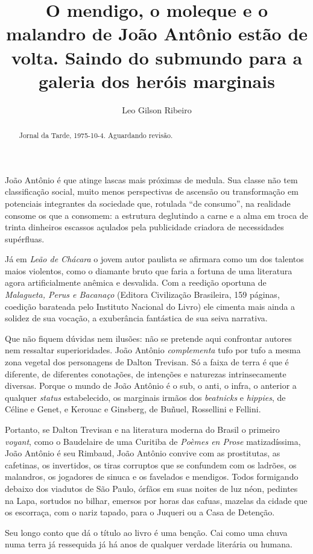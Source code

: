 \documentclass[
  letterpaper,
  DIV=11,
  numbers=noendperiod]{scrartcl}
\title{O mendigo, o moleque e o malandro de João Antônio estão de volta.
Saindo do submundo para a galeria dos heróis marginais}
\author{Leo Gilson Ribeiro}
\date{}
\begin{document}
\maketitle
\begin{abstract}
Jornal da Tarde, 1975-10-4. Aguardando revisão.
\end{abstract}

João Antônio é que atinge lascas mais próximas de medula. Sua classe não
tem classificação social, muito menos perspectivas de ascensão ou
transformação em potenciais integrantes da sociedade que, rotulada ``de
consumo'', na realidade consome os que a consomem: a estrutura
deglutindo a carne e a alma em troca de trinta dinheiros escassos
açulados pela publicidade criadora de necessidades supérfluas.

Já em \emph{Leão de Chácara} o jovem autor paulista se afirmara como um
dos talentos maios violentos, como o diamante bruto que faria a fortuna
de uma literatura agora artificialmente anêmica e desvalida. Com a
reedição oportuna de \emph{Malagueta, Perus e Bacanaço} (Editora
Civilização Brasileira, 159 páginas, coedição barateada pelo Instituto
Nacional do Livro) ele cimenta mais ainda a solidez de sua vocação, a
exuberância fantástica de sua seiva narrativa.

Que não fiquem dúvidas nem ilusões: não se pretende aqui confrontar
autores nem ressaltar superioridades. João Antônio \emph{complementa}
tufo por tufo a mesma zona vegetal dos personagens de Dalton Trevisan.
Só a faixa de terra é que é diferente, de diferentes conotações, de
intenções e naturezas intrinsecamente diversas. Porque o mundo de João
Antônio é o sub, o anti, o infra, o anterior a qualquer \emph{status}
estabelecido, os marginais irmãos dos \emph{beatnicks} e \emph{hippies},
de Céline e Genet, e Kerouac e Ginsberg, de Buñuel, Rossellini e
Fellini.

Portanto, se Dalton Trevisan e na literatura moderna do Brasil o
primeiro \emph{voyant}, como o Baudelaire de uma Curitiba de
\emph{Poèmes en Prose} matizadíssima, João Antônio é seu Rimbaud, João
Antônio convive com as prostitutas, as cafetinas, os invertidos, os
tiras corruptos que se confundem com os ladrões, os malandros, os
jogadores de sinuca e os favelados e mendigos. Todos formigando debaixo
dos viadutos de São Paulo, órfãos em suas noites de luz néon, pedintes
na Lapa, sortudos no bilhar, emersos por horas das cafuas, mazelas da
cidade que os escorraça, com o nariz tapado, para o Juqueri ou a Casa de
Detenção.

Seu longo conto que dá o título ao livro é uma benção. Cai como uma
chuva numa terra já ressequida já há anos de qualquer verdade literária
ou humana.
\end{document}
